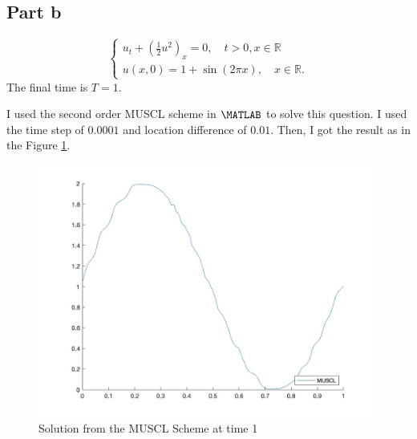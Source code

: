 \subsection{Part b}

\begin{question}
    $$
    \left\{\begin{array}{l}
    u_t+\left(\frac{1}{2} u^2\right)_x=0, \quad t>0, x \in \mathbb{R} \\
    u(x, 0)=1+\sin (2 \pi x), \quad x \in \mathbb{R} .
    \end{array}\right.
    $$
    The final time is $T=1$.
\end{question}

\begin{answer}
    I used the second order MUSCL scheme in $\MATLAB$ to solve this question. I used the time step of $0.0001$ and location difference of $0.01$. Then, I got the result as in the Figure \ref{fig:fig3}.
    \begin{figure}[H]
        \centering
        \includegraphics[width=0.99\textwidth]{Result3.jpg}
        \caption{\label{fig:fig3}Solution from the MUSCL Scheme at time 1}
    \end{figure}
\end{answer}